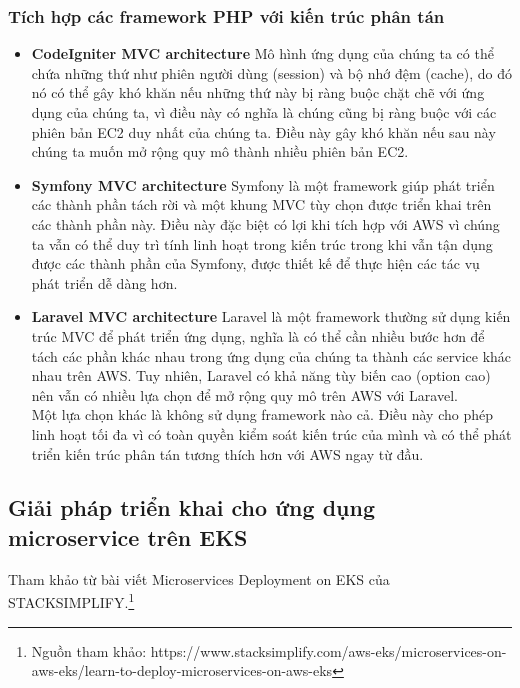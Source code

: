 \subsubsection{Tích hợp các framework PHP với kiến trúc phân tán}
    \begin{itemize}
        \item \textbf{CodeIgniter MVC architecture}
        \newline
        Mô hình ứng dụng của chúng ta có thể chứa những thứ như phiên người dùng (session) và bộ nhớ đệm (cache), do đó nó có thể gây khó khăn nếu những thứ này bị ràng buộc chặt chẽ với ứng dụng của chúng ta, vì điều này có nghĩa là chúng cũng bị ràng buộc với các phiên bản EC2 duy nhất của chúng ta. Điều này gây khó khăn nếu sau này chúng ta muốn mở rộng quy mô thành nhiều phiên bản EC2.
        \item \textbf{Symfony MVC architecture}
        \newline
        Symfony là một framework giúp phát triển các thành phần tách rời và một khung MVC tùy chọn được triển khai trên các thành phần này. Điều này đặc biệt có lợi khi tích hợp với AWS vì chúng ta vẫn có thể duy trì tính linh hoạt trong kiến trúc trong khi vẫn tận dụng được các thành phần của Symfony, được thiết kế để thực hiện các tác vụ phát triển dễ dàng hơn.
        \item \textbf{Laravel MVC architecture}
        \newline
        Laravel là một framework thường sử dụng kiến trúc MVC để phát triển ứng dụng, nghĩa là có thể cần nhiều bước hơn để tách các phần khác nhau trong ứng dụng của chúng ta thành các service khác nhau trên AWS. Tuy nhiên, Laravel có khả năng tùy biến cao (option cao) nên vẫn có nhiều lựa chọn để mở rộng quy mô trên AWS với Laravel.\\[0.5cm]
        Một lựa chọn khác là không sử dụng framework nào cả. Điều này cho phép linh hoạt tối đa vì có toàn quyền kiểm soát kiến trúc của mình và có thể phát triển kiến trúc phân tán tương thích hơn với AWS ngay từ đầu.
    \end{itemize}
\subsection{Giải pháp triển khai cho ứng dụng microservice trên EKS}
\noindent Tham khảo từ bài viết Microservices Deployment on EKS của STACKSIMPLIFY.\footnote{Nguồn tham khảo: https://www.stacksimplify.com/aws-eks/microservices-on-aws-eks/learn-to-deploy-microservices-on-aws-eks}
